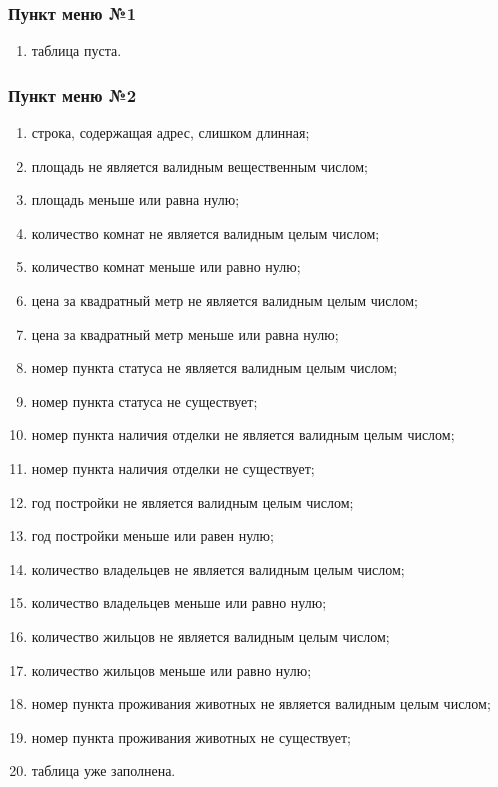 \documentclass[a4paper,12pt]{extarticle}
\begin{document}
\subsubsection{Пункт меню №1}
\begin{enumerate}
    \item таблица пуста.
\end{enumerate}

\subsubsection{Пункт меню №2}
\begin{enumerate}
    \item строка, содержащая адрес, слишком длинная;
    \item площадь не является валидным вещественным числом;
    \item площадь меньше или равна нулю;
    \item количество комнат не является валидным целым числом;
    \item количество комнат меньше или равно нулю;
    \item цена за квадратный метр не является валидным целым числом;
    \item цена за квадратный метр меньше или равна нулю;
    \item номер пункта статуса не является валидным целым числом;
    \item номер пункта статуса не существует;
    \item номер пункта наличия отделки не является валидным целым числом;
    \item номер пункта наличия отделки не существует;
    \item год постройки не является валидным целым числом;
    \item год постройки меньше или равен нулю;
    \item количество владельцев не является валидным целым числом;
    \item количество владельцев меньше или равно нулю;
    \item количество жильцов не является валидным целым числом;
    \item количество жильцов меньше или равно нулю;
    \item номер пункта проживания животных не является валидным целым числом;
    \item номер пункта проживания животных не существует;
    \item таблица уже заполнена.
\end{enumerate}
\end{document}
